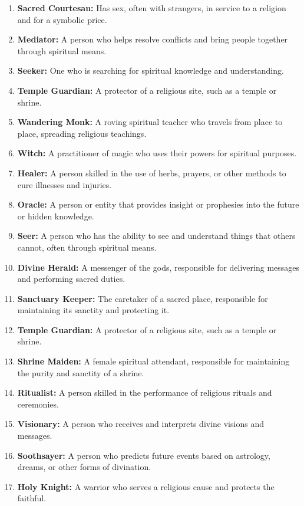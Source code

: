 \begin{enumerate}
    \item \textbf{Sacred Courtesan:} Has sex, often with strangers, in service to a religion and for a symbolic price.
    \item \textbf{Mediator:} A person who helps resolve conflicts and bring people together through spiritual means.
    \item \textbf{Seeker:} One who is searching for spiritual knowledge and understanding.
    \item \textbf{Temple Guardian:} A protector of a religious site, such as a temple or shrine.
    \item \textbf{Wandering Monk:} A roving spiritual teacher who travels from place to place, spreading religious teachings.
    \item \textbf{Witch:} A practitioner of magic who uses their powers for spiritual purposes.
    \item \textbf{Healer:} A person skilled in the use of herbs, prayers, or other methods to cure illnesses and injuries.
    \item \textbf{Oracle:} A person or entity that provides insight or prophesies into the future or hidden knowledge.
    \item \textbf{Seer:} A person who has the ability to see and understand things that others cannot, often through spiritual means.
    \item \textbf{Divine Herald:} A messenger of the gods, responsible for delivering messages and performing sacred duties.
    \item \textbf{Sanctuary Keeper:} The caretaker of a sacred place, responsible for maintaining its sanctity and protecting it.
    \item \textbf{Temple Guardian:} A protector of a religious site, such as a temple or shrine.
    \item \textbf{Shrine Maiden:} A female spiritual attendant, responsible for maintaining the purity and sanctity of a shrine.
    \item \textbf{Ritualist:} A person skilled in the performance of religious rituals and ceremonies.
    \item \textbf{Visionary:} A person who receives and interprets divine visions and messages.
    \item \textbf{Soothsayer:} A person who predicts future events based on astrology, dreams, or other forms of divination.
    \item \textbf{Holy Knight:} A warrior who serves a religious cause and protects the faithful.

\end{enumerate}
